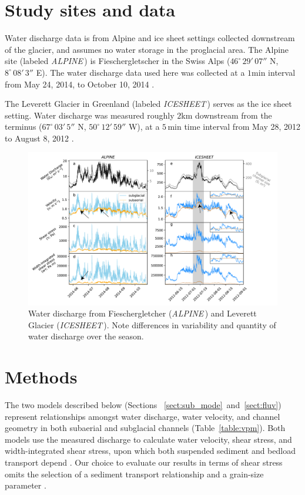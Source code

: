 \documentclass[tc, manuscript]{copernicus}
\newcommand{\alpine}{\textit{ALPINE}\,}
\newcommand{\icesheet}{\textit{ICESHEET}\,}
\begin{document}
\section{Study sites and data}
\label{sect:ss_data}

Water discharge data is from Alpine and ice sheet settings collected downstream of the glacier, and assumes no water storage in the proglacial area.
The Alpine site (labeled \alpine{}) is  Fieschergletscher in the Swiss Alps ($46^\circ\,29'\,07''$ N, $8^\circ\,08'\,3''$ E).
The water discharge data used here was collected at a $1$\unit{min} interval from May 24, 2014, to October 10, 2014 \citep[Figure~\ref{fig:Qw}\,a][]{felix2022}.

The Leverett Glacier in Greenland (labeled \icesheet{}) serves as the ice sheet setting.
Water discharge was measured roughly $2$\unit{km} downstream from the terminus ($67^\circ\,03'\,5''$ N, $50^\circ\,12'\,59''$ W), at a $5$\,\unit{min} time interval from May 28, 2012 to August 8, 2012 \citet[][Figure~\ref{fig:Qw}\,b]{tedstone2013}.


\begin{figure}[hbt!]
  \centering
  \includegraphics[width=0.9\linewidth]{Fig2.pdf}
  \caption{Water discharge from Fieschergletcher (\alpine) and Leverett Glacier (\icesheet).
    Note differences in variability and quantity of water discharge over the season.
  }
  \label{fig:Qw}
\end{figure}


\section{Methods}
\label{sect:meth}
The two models described below (Sections ~\ref{sect:sub_mode}~and~\ref{sect:fluv}) represent relationships amongst water discharge, water velocity, and channel geometry in both subaerial and subglacial channels (Table~\ref{table:vpm}).
Both models use the measured discharge to calculate water velocity, shear stress, and width-integrated shear stress, upon which both suspended sediment and bedload transport depend \citep[Figure \ref{fig:cartoon}; ][]{shields1936}.
Our choice to evaluate our results in terms of shear stress omits the selection of a sediment transport relationship and a grain-size parameter \citep[e.g.][]{shields1936,meyer1948}.
\end{document}
